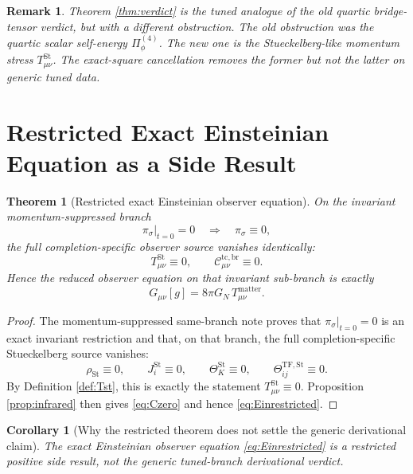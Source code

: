\documentclass[11pt]{article}
\newtheorem{remark}{Remark}
\newtheorem{corollary}{Corollary}
\newtheorem{theorem}{Theorem}
\begin{document}
\begin{remark}
Theorem \ref{thm:verdict} is the tuned analogue of the old quartic bridge-tensor verdict, but with a different obstruction. The old obstruction was the quartic scalar self-energy \(\Pi_\phi^{(4)}\). The new one is the Stueckelberg-like momentum stress \(T_{\mu\nu}^{\mathrm{St}}\). The exact-square cancellation removes the former but not the latter on generic tuned data.
\end{remark}

\section{Restricted Exact Einsteinian Equation as a Side Result}

\begin{theorem}[Restricted exact Einsteinian observer equation]
\label{thm:restricted}
On the invariant momentum-suppressed branch
\begin{equation}
\pi_\sigma|_{t=0}=0
\quad\Longrightarrow\quad
\pi_\sigma\equiv 0,
\label{eq:restricted}
\end{equation}
the full completion-specific observer source vanishes identically:
\begin{equation}
T_{\mu\nu}^{\mathrm{St}}\equiv 0,
\qquad
\mathcal C_{\mu\nu}^{\mathrm{tc,br}}\equiv 0.
\label{eq:Czero}
\end{equation}
Hence the reduced observer equation on that invariant sub-branch is exactly
\begin{equation}
G_{\mu\nu}[g]
=
8\pi G_N\,T_{\mu\nu}^{\mathrm{matter}}.
\label{eq:Einrestricted}
\end{equation}
\end{theorem}

\begin{proof}
The momentum-suppressed same-branch note proves that \(\pi_\sigma|_{t=0}=0\) is an exact invariant restriction and that, on that branch, the full completion-specific Stueckelberg source vanishes:
\[
\rho_{\mathrm{St}}\equiv 0,
\qquad
J_i^{\mathrm{St}}\equiv 0,
\qquad
\Theta_K^{\mathrm{St}}\equiv 0,
\qquad
\Theta_{ij}^{\mathrm{TF,St}}\equiv 0.
\]
By Definition \ref{def:Tst}, this is exactly the statement \(T_{\mu\nu}^{\mathrm{St}}\equiv 0\). Proposition \ref{prop:infrared} then gives \eqref{eq:Czero} and hence \eqref{eq:Einrestricted}.
\end{proof}

\begin{corollary}[Why the restricted theorem does not settle the generic derivational claim]
\label{cor:restricted}
The exact Einsteinian observer equation \eqref{eq:Einrestricted} is a restricted positive side result, not the generic tuned-branch derivational verdict.
\end{corollary}
\end{document}
